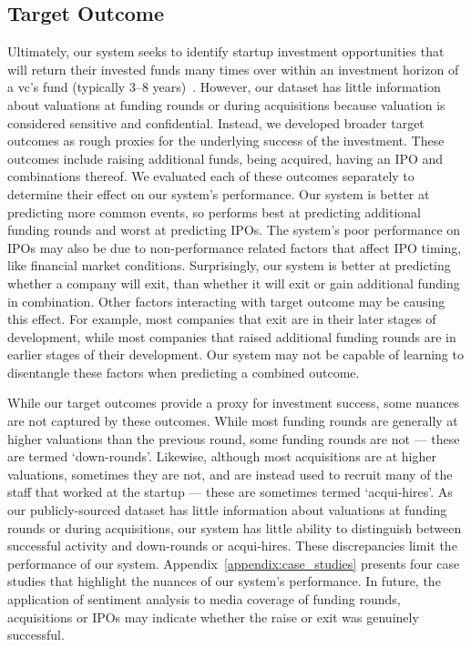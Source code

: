 \documentclass[../thesis/thesis.tex]{subfiles}
\begin{document}
\subsection{Target Outcome}

Ultimately, our system seeks to identify startup investment opportunities that will return their invested funds many times over within an investment horizon of a \gls{vc}'s fund (typically 3--8 years)~\cite{gompers1995}. However, our dataset has little information about valuations at funding rounds or during acquisitions because valuation is considered sensitive and confidential. Instead, we developed broader target outcomes as rough proxies for the underlying success of the investment. These outcomes include raising additional funds, being acquired, having an IPO and combinations thereof. We evaluated each of these outcomes separately to determine their effect on our system's performance. Our system is better at predicting more common events, so performs best at predicting additional funding rounds and worst at predicting IPOs. The system's poor performance on IPOs may also be due to non-performance related factors that affect IPO timing, like financial market conditions. Surprisingly, our system is better at predicting whether a company will exit, than whether it will exit or gain additional funding in combination. Other factors interacting with target outcome may be causing this effect. For example, most companies that exit are in their later stages of development, while most companies that raised additional funding rounds are in earlier stages of their development. Our system may not be capable of learning to disentangle these factors when predicting a combined outcome.

While our target outcomes provide a proxy for investment success, some nuances are not captured by these outcomes. While most funding rounds are generally at higher valuations than the previous round, some funding rounds are not --- these are termed `down-rounds'. Likewise, although most acquisitions are at higher valuations, sometimes they are not, and are instead used to recruit many of the staff that worked at the startup --- these are sometimes termed `acqui-hires'. As our publicly-sourced dataset has little information about valuations at funding rounds or during acquisitions, our system has little ability to distinguish between successful activity and down-rounds or acqui-hires. These discrepancies limit the performance of our system. Appendix~\ref{appendix:case_studies} presents four case studies that highlight the nuances of our system's performance. In future, the application of sentiment analysis to media coverage of funding rounds, acquisitions or IPOs may indicate whether the raise or exit was genuinely successful.
\end{document}

